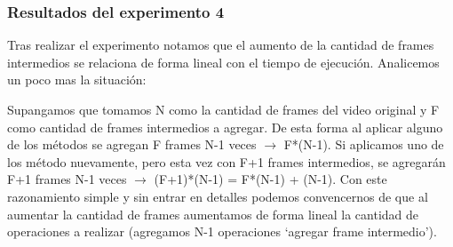 \subsubsection{Resultados del experimento 4}
\begin{figure}[ht]
	\begin{center}
	\end{center}
\end{figure}
\par Tras realizar el experimento notamos que el aumento de la cantidad de frames intermedios se relaciona de forma lineal con el tiempo de ejecuci\'on. Analicemos un poco mas la situaci\'on:

\par Supangamos que tomamos N como la cantidad de frames del video original y F como cantidad de frames intermedios a agregar. De esta forma al aplicar alguno de los m\'etodos se agregan F frames N-1 veces $\longrightarrow$ F*(N-1). Si aplicamos uno de los m\'etodo nuevamente, pero esta vez con F+1 frames intermedios, se agregar\'an F+1 frames N-1 veces $\longrightarrow$ (F+1)*(N-1) = F*(N-1) + (N-1). Con este razonamiento simple y sin entrar en detalles podemos convencernos de que al aumentar la cantidad de frames aumentamos de forma lineal la cantidad de operaciones a realizar (agregamos N-1 operaciones `agregar frame intermedio').